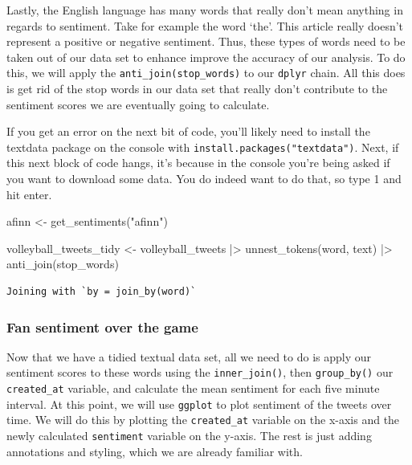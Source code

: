 \documentclass[
  letterpaper,
  DIV=11,
  numbers=noendperiod]{scrreprt}
\newenvironment{Shaded}{\begin{snugshade}}{\end{snugshade}}
\newcommand{\FunctionTok}[1]{\textcolor[rgb]{0.28,0.35,0.67}{#1}}
\newcommand{\NormalTok}[1]{\textcolor[rgb]{0.00,0.23,0.31}{#1}}
\newcommand{\OtherTok}[1]{\textcolor[rgb]{0.00,0.23,0.31}{#1}}
\newcommand{\SpecialCharTok}[1]{\textcolor[rgb]{0.37,0.37,0.37}{#1}}
\newcommand{\StringTok}[1]{\textcolor[rgb]{0.13,0.47,0.30}{#1}}
\begin{document}
Lastly, the English language has many words that really don't mean
anything in regards to sentiment. Take for example the word `the'. This
article really doesn't represent a positive or negative sentiment. Thus,
these types of words need to be taken out of our data set to enhance
improve the accuracy of our analysis. To do this, we will apply the
\texttt{anti\_join(stop\_words)} to our \texttt{dplyr} chain. All this
does is get rid of the stop words in our data set that really don't
contribute to the sentiment scores we are eventually going to calculate.

If you get an error on the next bit of code, you'll likely need to
install the textdata package on the console with
\texttt{install.packages("textdata")}. Next, if this next block of code
hangs, it's because in the console you're being asked if you want to
download some data. You do indeed want to do that, so type 1 and hit
enter.

\begin{Shaded}
\begin{Highlighting}[]
\NormalTok{afinn }\OtherTok{\textless{}{-}} \FunctionTok{get\_sentiments}\NormalTok{(}\StringTok{"afinn"}\NormalTok{)}

\NormalTok{volleyball\_tweets\_tidy }\OtherTok{\textless{}{-}}\NormalTok{ volleyball\_tweets }\SpecialCharTok{|\textgreater{}} 
  \FunctionTok{unnest\_tokens}\NormalTok{(word, text) }\SpecialCharTok{|\textgreater{}} 
  \FunctionTok{anti\_join}\NormalTok{(stop\_words) }
\end{Highlighting}
\end{Shaded}

\begin{verbatim}
Joining with `by = join_by(word)`
\end{verbatim}

\hypertarget{fan-sentiment-over-the-game}{%
\subsubsection{Fan sentiment over the
game}\label{fan-sentiment-over-the-game}}

Now that we have a tidied textual data set, all we need to do is apply
our sentiment scores to these words using the \texttt{inner\_join()},
then \texttt{group\_by()} our \texttt{created\_at} variable, and
calculate the mean sentiment for each five minute interval. At this
point, we will use \texttt{ggplot} to plot sentiment of the tweets over
time. We will do this by plotting the \texttt{created\_at} variable on
the x-axis and the newly calculated \texttt{sentiment} variable on the
y-axis. The rest is just adding annotations and styling, which we are
already familiar with.
\end{document}
